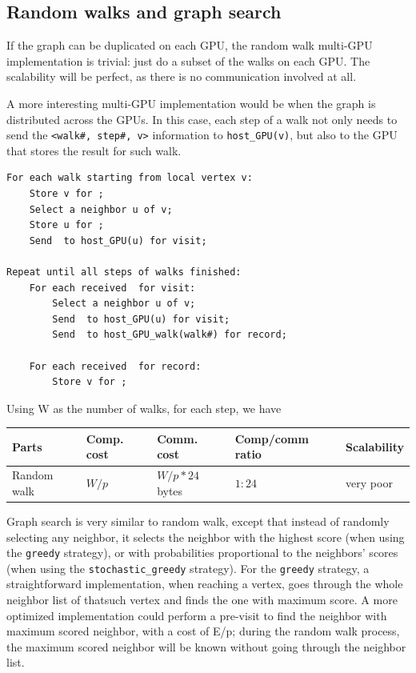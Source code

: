 \documentclass[10pt,oneside]{memoir}
\begin{document}
\hypertarget{random-walks-and-graph-search}{%
\subsection{Random walks and graph
search}\label{random-walks-and-graph-search}}

If the graph can be duplicated on each GPU, the random walk multi-GPU
implementation is trivial: just do a subset of the walks on each GPU.
The scalability will be perfect, as there is no communication involved
at all.

A more interesting multi-GPU implementation would be when the graph is
distributed across the GPUs. In this case, each step of a walk not only
needs to send the \texttt{\textless{}walk\#,\ step\#,\ v\textgreater{}}
information to \texttt{host\_GPU(v)}, but also to the GPU that stores
the result for such walk.

\begin{verbatim}
For each walk starting from local vertex v:
    Store v for ;
    Select a neighbor u of v;
    Store u for ;
    Send  to host_GPU(u) for visit;

Repeat until all steps of walks finished:
    For each received  for visit:
        Select a neighbor u of v;
        Send  to host_GPU(u) for visit;
        Send  to host_GPU_walk(walk#) for record;

    For each received  for record:
        Store v for ;
\end{verbatim}

Using W as the number of walks, for each step, we have

\begin{longtable}[]{@{}lllll@{}}
\toprule
Parts & Comp. cost & Comm. cost & Comp/comm ratio &
Scalability\tabularnewline
\midrule
\endhead
Random walk & \(W/p\) & \(W/p * 24\) bytes & \(1 : 24\) & very
poor\tabularnewline
\bottomrule
\end{longtable}

Graph search is very similar to random walk, except that instead of
randomly selecting any neighbor, it selects the neighbor with the
highest score (when using the \texttt{greedy} strategy), or with
probabilities proportional to the neighbors' scores (when using the
\texttt{stochastic\_greedy} strategy). For the \texttt{greedy} strategy,
a straightforward implementation, when reaching a vertex, goes through
the whole neighbor list of thatsuch vertex and finds the one with
maximum score. A more optimized implementation could perform a pre-visit
to find the neighbor with maximum scored neighbor, with a cost of E/p;
during the random walk process, the maximum scored neighbor will be
known without going through the neighbor list.
\end{document}
